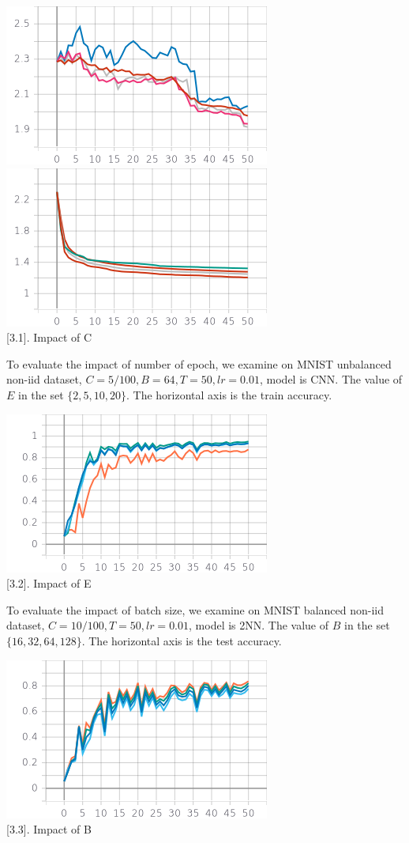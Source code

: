 \documentclass{article}
\theoremstyle{theorem}
\theoremstyle{definition}
\begin{document}
\begin{center}
		\includegraphics[scale=0.5]{Cniid.png}
			\includegraphics[scale=0.5]{Ciid.png} \\
	\figurename[3.1]{. Impact of C}
\end{center}
To evaluate the impact of number of epoch, we examine on MNIST unbalanced non-iid dataset, $C=5/100, B=64, T=50,lr=0.01$, model is CNN. The value of $E$ in the set $\{2,5,10,20\}$. The horizontal axis is the train accuracy.
\begin{center}
	\includegraphics[scale=0.65]{E.png}\\
	\figurename[3.2]{. Impact of E}
\end{center}
To evaluate the impact of batch size, we examine on MNIST balanced non-iid dataset, $C=10/100, T=50,lr=0.01$, model is 2NN. The value of $B$ in the set $\{16,32,64,128\}$. The horizontal axis is the test accuracy.
\begin{center}
	\includegraphics[scale=0.65]{B.png}\\
	\figurename[3.3]{. Impact of B}
\end{center}
\end{document}
